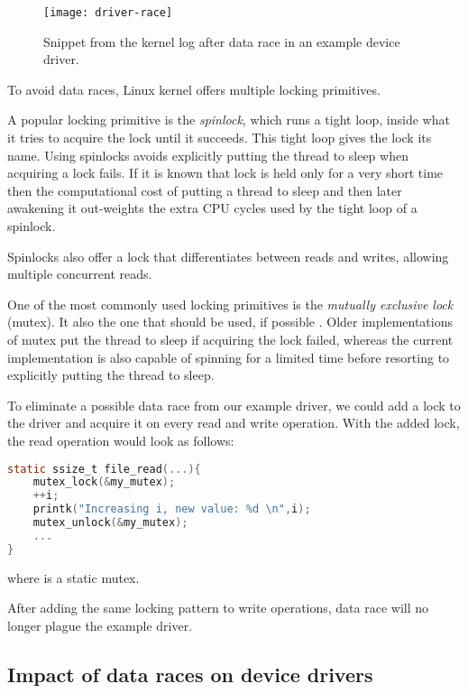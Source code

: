 \documentclass[..thesis.tex]{subfiles}
\begin{document}
\begin{figure}[H]
\centering
\texttt{[image: driver-race]}
\caption{Snippet from the kernel log after data race in an example device driver.}
\label{fig:driver-race}
\end{figure}



To avoid data races, Linux kernel offers multiple locking primitives. 

A popular locking primitive is the \textit{spinlock}, which runs a tight loop, inside what it tries to acquire the lock until it succeeds.
This tight loop gives the lock its name. Using spinlocks avoids explicitly putting the thread to sleep when acquiring a lock fails.
If it is known that lock is held only for a very short time then the computational cost of putting a thread to sleep and then later awakening
it out-weights the extra CPU cycles used by the tight loop of a spinlock.

Spinlocks also offer a lock that differentiates between reads and writes, allowing multiple concurrent reads.

One of the most commonly used locking primitives is the \textit{mutually exclusive lock} (mutex). It also the one that should be used, if possible
\cite[locking/mutex-design.txt]{torvalds_linux}. Older implementations of mutex put the thread to sleep if acquiring the lock failed,
whereas the current implementation is also capable of spinning for a limited time before resorting to explicitly putting the thread to sleep.

To eliminate a possible data race from our example driver, we could add a lock to the driver and acquire it on every read and write operation.
With the added lock, the read operation would look as follows:

\begin{lstlisting}[language=C,style=def]
static ssize_t file_read(...){
    mutex_lock(&my_mutex);
    ++i;
    printk("Increasing i, new value: %d \n",i);
    mutex_unlock(&my_mutex);
    ...
}
\end{lstlisting}

where  is a static mutex.

After adding the same locking pattern to write operations, data race will no longer plague the example driver.

\subsection{Impact of data races on device drivers}
\end{document}

